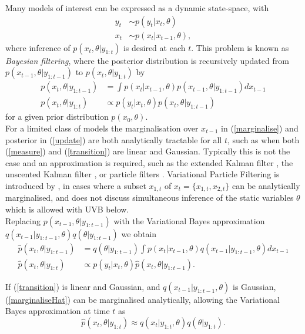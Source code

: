 \documentclass[12pt,a4paper]{article}\usepackage[]{graphicx}\usepackage[]{color}
\begin{document}
Many models of interest can be expressed as a dynamic state-space, with
\begin{align}
y_t &\sim p(y_t | x_{t}, \theta) \label{measure} \\
x_t &\sim p(x_t | x_{t-1}, \theta) \label{transition} ,
\end{align}
where inference of $p(x_t, \theta | y_{1:t})$ is desired at each $t$. This problem is known as \textit{Bayesian filtering}, where the posterior distribution is recursively updated from $p(x_{t-1}, \theta | y_{1:t-1})$ to $p(x_t, \theta | y_{1:t})$ by
\begin{align}
p(x_t, \theta | y_{1:t-1}) &= \int p(x_t | x_{t-1}, \theta) p(x_{t-1}, \theta | y_{1:t-1})dx_{t-1} \label{marginalise} \\
p(x_t, \theta | y_{1:t}) &\propto p(y_t | x_t, \theta) p(x_t, \theta | y_{1:t-1}) \label{update}
\end{align}
for a given prior distribution $p(x_0, \theta)$. 
\\

For a limited class of models the marginalisation over $x_{t-1}$ in (\ref{marginalise}) and posterior in (\ref{update}) are both analytically tractable for all $t$, such as when both (\ref{measure}) and (\ref{transition}) are linear and Gaussian. Typically this is not the case and an approximation is required, such as the extended Kalman filter \citep{Anderson1979}, the unscented Kalman filter \citep{Wan2000}, or particle filters \citet{Arulampalam2002}. Variational Particle Filtering is introduced by \citet{Smidl2008}, in cases where a subset $x_{1, t}$ of $x_t = \{x_{1, t}, x_{2, t}\}$ can be analytically marginalised, and does not discuss simultaneous inference of the static variables $\theta$ which is allowed with UVB below.
\\

Replacing $p(x_{t-1}, \theta | y_{1:t-1})$ with the Variational Bayes approximation $q(x_{t-1} | y_{1:t-1}, \theta)q(\theta|y_{1:t-1})$ we obtain 
\begin{align}
\hat{p}(x_t, \theta | y_{1:t-1}) &= q(\theta | y_{1:t-1}) \int p(x_t | x_{t-1}, \theta) q(x_{t-1} | y_{1:t-1}, \theta)dx_{t-1} \label{marginaliseHat} \\
\hat{p}(x_t, \theta | y_{1:t}) &\propto p(y_t | x_t, \theta)\hat{p}(x_t, \theta | y_{1:t-1}). \label{updateHat}
\end{align}

If (\ref{transition}) is linear and Gaussian, and  $q(x_{t-1} | y_{1:t-1}, \theta)$ is Gaussian, (\ref{marginaliseHat}) can be marginalised analytically, allowing the Variational Bayes approximation at time $t$ as
\begin{equation}
\label{UVBfilter}
\hat{p}(x_t, \theta | y_{1:t}) \approx q(x_{t} | y_{1:t}, \theta)q(\theta|y_{1:t}).
\end{equation}
\\
\end{document}
